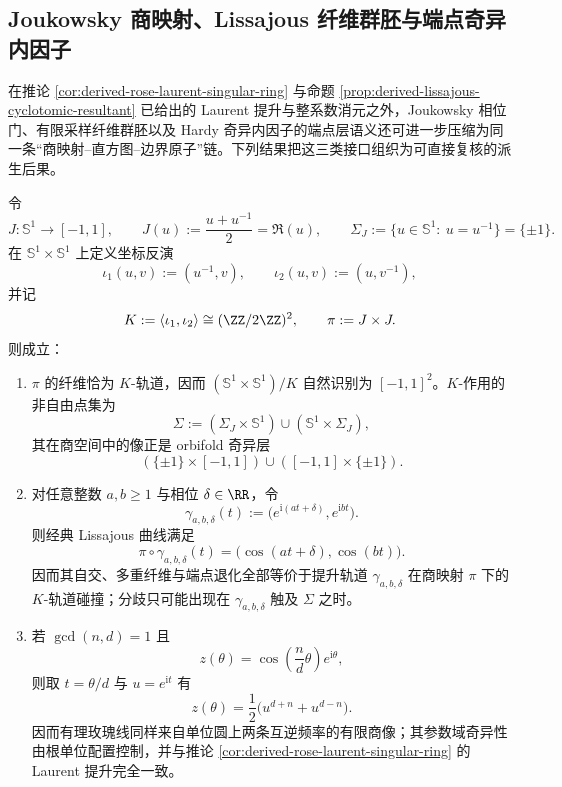 \subsection{Joukowsky 商映射、Lissajous 纤维群胚与端点奇异内因子}

在推论 \ref{cor:derived-rose-laurent-singular-ring} 与命题 \ref{prop:derived-lissajous-cyclotomic-resultant} 已给出的 Laurent 提升与整系数消元之外，Joukowsky 相位门、有限采样纤维群胚以及 Hardy 奇异内因子的端点层语义还可进一步压缩为同一条“商映射--直方图--边界原子”链。下列结果把这三类接口组织为可直接复核的派生后果。

\begin{theorem}\label{thm:derived-joukowsky-lissajous-rose-orbifold}
令
\[
J:\mathbb S^1\to[-1,1],
\qquad
J(u):=\frac{u+u^{-1}}{2}=\Re(u),
\qquad
\Sigma_J:=\{u\in\mathbb S^1:\ u=u^{-1}\}=\{\pm1\}.
\]
在 \(\mathbb S^1\times\mathbb S^1\) 上定义坐标反演
\[
\iota_1(u,v):=(u^{-1},v),
\qquad
\iota_2(u,v):=(u,v^{-1}),
\]
并记
\[
K:=\langle \iota_1,\iota_2\rangle\cong(\ZZ/2\ZZ)^2,
\qquad
\pi:=J\times J.
\]
则成立：
\begin{enumerate}
  \item \(\pi\) 的纤维恰为 \(K\)-轨道，因而 \((\mathbb S^1\times\mathbb S^1)/K\) 自然识别为 \([-1,1]^2\)。\(K\)-作用的非自由点集为
  \[
  \Sigma:=(\Sigma_J\times\mathbb S^1)\cup(\mathbb S^1\times\Sigma_J),
  \]
  其在商空间中的像正是 orbifold 奇异层
  \[
  (\{\pm1\}\times[-1,1])\cup([-1,1]\times\{\pm1\}).
  \]
  \item 对任意整数 \(a,b\ge 1\) 与相位 \(\delta\in\RR\)，令
  \[
  \gamma_{a,b,\delta}(t):=\bigl(e^{\mathrm i(at+\delta)},e^{\mathrm i bt}\bigr).
  \]
  则经典 Lissajous 曲线满足
  \[
  \pi\circ\gamma_{a,b,\delta}(t)=\bigl(\cos(at+\delta),\cos(bt)\bigr).
  \]
  因而其自交、多重纤维与端点退化全部等价于提升轨道 \(\gamma_{a,b,\delta}\) 在商映射 \(\pi\) 下的 \(K\)-轨道碰撞；分歧只可能出现在 \(\gamma_{a,b,\delta}\) 触及 \(\Sigma\) 之时。
  \item 若 \(\gcd(n,d)=1\) 且
  \[
  z(\theta)=\cos\!\left(\frac{n}{d}\theta\right)e^{\mathrm i\theta},
  \]
  则取 \(t=\theta/d\) 与 \(u=e^{\mathrm i t}\) 有
  \[
  z(\theta)=\frac12\bigl(u^{d+n}+u^{d-n}\bigr).
  \]
  因而有理玫瑰线同样来自单位圆上两条互逆频率的有限商像；其参数域奇异性由根单位配置控制，并与推论 \ref{cor:derived-rose-laurent-singular-ring} 的 Laurent 提升完全一致。
\end{enumerate}
\end{theorem}
